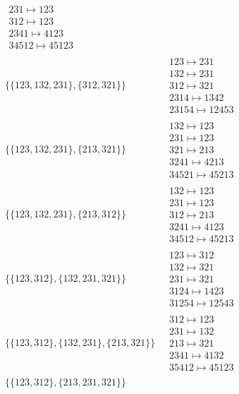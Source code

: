 \begin{scriptsize}
\begin{align}
\begin{matrix}
231 \mapsto 123
\\
312 \mapsto 123
\\
2341 \mapsto 4123
\\
34512 \mapsto 45123
\end{matrix}
\\
\{\{123, 132, 231\}, \{312, 321\}\}
\ 
&
\begin{matrix}
123 \mapsto 231
\\
132 \mapsto 231
\\
312 \mapsto 321
\\
2314 \mapsto 1342
\\
23154 \mapsto 12453
\end{matrix}
\\
\{\{123, 132, 231\}, \{213, 321\}\}
\ 
&
\begin{matrix}
132 \mapsto 123
\\
231 \mapsto 123
\\
321 \mapsto 213
\\
3241 \mapsto 4213
\\
34521 \mapsto 45213
\end{matrix}
\\
\{\{123, 132, 231\}, \{213, 312\}\}
\ 
&
\begin{matrix}
132 \mapsto 123
\\
231 \mapsto 123
\\
312 \mapsto 213
\\
3241 \mapsto 4123
\\
34512 \mapsto 45213
\end{matrix}
\\
\{\{123, 312\}, \{132, 231, 321\}\}
\ 
&
\begin{matrix}
123 \mapsto 312
\\
132 \mapsto 321
\\
231 \mapsto 321
\\
3124 \mapsto 1423
\\
31254 \mapsto 12543
\end{matrix}
\\
\{\{123, 312\}, \{132, 231\}, \{213, 321\}\}
\ 
&
\begin{matrix}
312 \mapsto 123
\\
231 \mapsto 132
\\
213 \mapsto 321
\\
2341 \mapsto 4132
\\
35412 \mapsto 45123
\end{matrix}
\\
\{\{123, 312\}, \{213, 231, 321\}\}
\ 
&
\begin{matrix}

\end{matrix}
\end{align}
\end{scriptsize}

